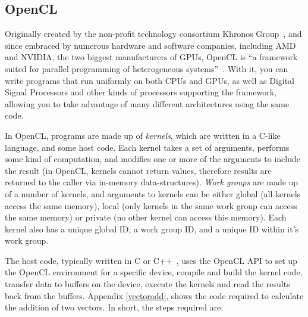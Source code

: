 \subsection{OpenCL}

Originally created by the non-profit technology consortium Khronos
Group~\cite{khronos}, and since embraced by numerous hardware and
software companies, including AMD and NVIDIA, the two biggest
manufacturers of GPUs, OpenCL is ``a framework suited for parallel
programming of heterogeneous systems''~\cite{opencl-quote}. With it,
you can write programs that run uniformly on both CPUs and GPUs, as
well as Digital Signal Processors and other kinds of processors
supporting the framework, allowing you to take advantage of many
different architectures using the same code.

In OpenCL, programs are made up of \emph{kernels}, which are written
in a C-like language, and some host code. Each kernel takes a set of
arguments, performs some kind of computation, and modifies one or more
of the arguments to include the result (in OpenCL, kernels cannot
return values, therefore results are returned to the caller via
in-memory data-structures). \emph{Work groups} are made up of a number
of kernels, and arguments to kernels can be either global (all kernels
access the same memory), local (only kernels in the same work group
can access the same memory) or private (no other kernel can access
this memory). Each kernel also has a unique global ID, a work group
ID, and a unique ID within it's work group.

The host code, typically written in C or C++~\cite{hostlang}, uses the
OpenCL API to set up the OpenCL environment for a specific device,
compile and build the kernel code, transfer data to buffers on the
device, execute the kernels and read the results back from the
buffers. Appendix \ref{vectoradd}, shows the code required to
calculate the addition of two vectors. In short, the steps required
are:

